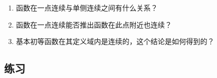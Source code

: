 \documentclass[a4paper,punct=CCT]{ctexbook}
\theoremstyle{definition}
\theoremstyle{remark}
\newif\ifshowex
\newif\ifshowsolp
\begin{document}
\begin{enumerate}
\item 函数在一点连续与单侧连续之间有什么关系？

  \ifshowsolp
  参见定理\ref{thm:contsided}．
  \fi

\item 函数在一点连续能否推出函数在此点附近也连续？

  \ifshowsolp
  不能．
  \fi

\item 基本初等函数在其定义域内是连续的，这个结论是如何得到的？

  \ifshowsolp
  其实这要把基本初等函数分成两类来看：一类是超越函数（transcedental functions）、另一类是代数函数（algebraic functions）．代数函数基本上可以由实数公理推出来．超越函数中的指数函数可以定义成
  \begin{equation*}
    \exp x \coloneq \lim_{n\to\infty} \paren*{1 + \frac xn}^n,
  \end{equation*}
  然后通过讨论这个数列的单调性和有界性论证它总是收敛的，并且研究出它的很多性质满足我们中学学过的指数运算法则．由这些结论，我们可以证明指数函数是连续的．再由此定义对数函数为指数函数的反函数，得到它的一系列性质．这样，对于超越的幂函数，例如\(x^π\)，就可以变形成\(\expb{π \ln x}\)，再由定理\ref{thm:contcomp}和定理\ref{thm:cont4ops}得出其连续性．

  对于超越函数中的三角函数，正弦函数的连续性已经由定理\ref{thm:contsin}给出，余弦函数的连续性可由\(\cos x = \sinp{π/2-x}\)再加上定理\ref{thm:contcomp}得出．剩下的三角函数，对正弦函数和余弦函数使用定理\ref{thm:cont4ops}即可得到它们的连续性．
  \fi
\end{enumerate}

\ifshowex
{}
\subsection*{练习}
\end{document}
